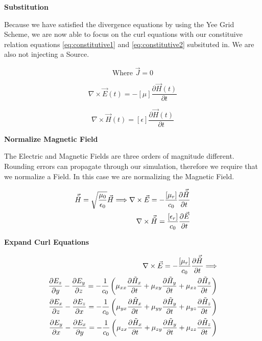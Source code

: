 \documentclass[a4paper,10pt]{article}
\begin{document}
\textbf{Substitution}

Because we have satisfied the divergence equations by using the Yee Grid Scheme, we are now able to focus on the curl equations with our constituive relation equations \eqref{eq:constitutive1} and \eqref{eq:constitutive2} subsituted in.  We are also not injecting a Source.

\begin{equation*}
 \mbox{Where }\vec{J} = 0
\end{equation*}


\begin{equation}
  \nabla \times \vec{E}(t) = -[\mu]\frac{\partial \vec{H}(t)}{\partial t}
\end{equation}


\begin{equation}
   \nabla \times \vec{H}(t) = [\epsilon]\frac{\partial\vec{H}(t)}{\partial t}
\end{equation}


\textbf{Normalize Magnetic Field}

The Electric and Magnetic Fields are three orders of magnitude different.  Rounding errors can propagate through our simulation, therefore we require that we normalize a Field.  In this case we are normalizing the Magnetic Field.

\begin{align}
  \vec{\tilde{H}} = \sqrt{\frac{\mu_0}{\epsilon_0}}\vec{H}
  \Longrightarrow 
  \nabla \times \vec{E} = -\frac{[\mu_r]}{c_0}\frac{\partial \vec{\tilde{H}}}{\partial t}\\
  \nabla \times \vec{\tilde{H}} =  \frac{[\epsilon_r]}{c_0}\frac{\partial \vec{E}}{\partial t}\notag
\end{align}


\textbf{Expand Curl Equations}

\begin{align}
  \nabla \times \vec{E} = -\frac{[\mu_r]}{c_0}\frac{\partial \vec{\tilde{H}}}{\partial t}
  \Longrightarrow\\
  \frac{\partial E_z}{\partial y} - \frac{\partial E_y}{\partial z} = -\frac{1}{c_0}\left(\mu_{xx} \frac{\partial\tilde{H}_x}{\partial t} + \mu_{xy} \frac{\partial\tilde{H}_y}{\partial t} + \mu_{xz} \frac{\partial\tilde{H}_z}{\partial t}\right)\notag\\
  \frac{\partial E_x}{\partial z} - \frac{\partial E_z}{\partial x} = -\frac{1}{c_0}\left(\mu_{yx} \frac{\partial\tilde{H}_x}{\partial t} + \mu_{yy} \frac{\partial\tilde{H}_y}{\partial t} + \mu_{yz} \frac{\partial\tilde{H}_z}{\partial t}\right)\notag\\
  \frac{\partial E_y}{\partial x} - \frac{\partial E_x}{\partial y} = -\frac{1}{c_0}\left(\mu_{zx} \frac{\partial\tilde{H}_x}{\partial t} + \mu_{zy} \frac{\partial\tilde{H}_y}{\partial t} + \mu_{zz} \frac{\partial\tilde{H}_z}{\partial t}\right)\notag
\end{align}
\end{document}

